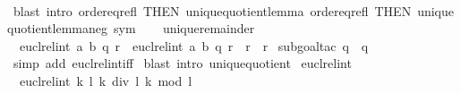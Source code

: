 \begin{isabellebody}
\ \ \ \ \ \isamarkupfalse%
\ {\isacharparenleft}{\kern0pt}blast\ intro{\isacharcolon}{\kern0pt}\ order{\isacharunderscore}{\kern0pt}eq{\isacharunderscore}{\kern0pt}refl\ {\isacharbrackleft}{\kern0pt}THEN\ unique{\isacharunderscore}{\kern0pt}quotient{\isacharunderscore}{\kern0pt}lemma{\isacharbrackright}{\kern0pt}\ order{\isacharunderscore}{\kern0pt}eq{\isacharunderscore}{\kern0pt}refl\ {\isacharbrackleft}{\kern0pt}THEN\ unique{\isacharunderscore}{\kern0pt}quotient{\isacharunderscore}{\kern0pt}lemma{\isacharunderscore}{\kern0pt}neg{\isacharbrackright}{\kern0pt}\ sym{\isacharparenright}{\kern0pt}{\isacharplus}{\kern0pt}\isanewline
\ \ \isamarkupfalse%
%
\endisatagproof
{\isafoldproof}%
%
\isadelimproof
\isanewline
%
\endisadelimproof
\isanewline
{}\isamarkupfalse%
\ unique{\isacharunderscore}{\kern0pt}remainder{\isacharcolon}{\kern0pt}\isanewline
\ \ {\isachardoublequoteopen}eucl{\isacharunderscore}{\kern0pt}rel{\isacharunderscore}{\kern0pt}int\ a\ b\ {\isacharparenleft}{\kern0pt}q{\isacharcomma}{\kern0pt}\ r{\isacharparenright}{\kern0pt}\ {\isasymLongrightarrow}\ eucl{\isacharunderscore}{\kern0pt}rel{\isacharunderscore}{\kern0pt}int\ a\ b\ {\isacharparenleft}{\kern0pt}q{\isacharprime}{\kern0pt}{\isacharcomma}{\kern0pt}\ r{\isacharprime}{\kern0pt}{\isacharparenright}{\kern0pt}\ {\isasymLongrightarrow}\ r\ {\isacharequal}{\kern0pt}\ r{\isacharprime}{\kern0pt}{\isachardoublequoteclose}\isanewline
%
\isadelimproof
%
\endisadelimproof
%
\isatagproof
{}\isamarkupfalse%
\ {\isacharparenleft}{\kern0pt}subgoal{\isacharunderscore}{\kern0pt}tac\ {\isachardoublequoteopen}q\ {\isacharequal}{\kern0pt}\ q{\isacharprime}{\kern0pt}{\isachardoublequoteclose}{\isacharparenright}{\kern0pt}\isanewline
\ \isamarkupfalse%
\ {\isacharparenleft}{\kern0pt}simp\ add{\isacharcolon}{\kern0pt}\ eucl{\isacharunderscore}{\kern0pt}rel{\isacharunderscore}{\kern0pt}int{\isacharunderscore}{\kern0pt}iff{\isacharparenright}{\kern0pt}\isanewline
{}\isamarkupfalse%
\ {\isacharparenleft}{\kern0pt}blast\ intro{\isacharcolon}{\kern0pt}\ unique{\isacharunderscore}{\kern0pt}quotient{\isacharparenright}{\kern0pt}\isanewline
{}\isamarkupfalse%
%
\endisatagproof
{\isafoldproof}%
%
\isadelimproof
\isanewline
%
\endisadelimproof
\isanewline
{}\isamarkupfalse%
\ eucl{\isacharunderscore}{\kern0pt}rel{\isacharunderscore}{\kern0pt}int{\isacharcolon}{\kern0pt}\isanewline
\ \ {\isachardoublequoteopen}eucl{\isacharunderscore}{\kern0pt}rel{\isacharunderscore}{\kern0pt}int\ k\ l\ {\isacharparenleft}{\kern0pt}k\ div\ l{\isacharcomma}{\kern0pt}\ k\ mod\ l{\isacharparenright}{\kern0pt}{\isachardoublequoteclose}\isanewline

\end{isabellebody}
